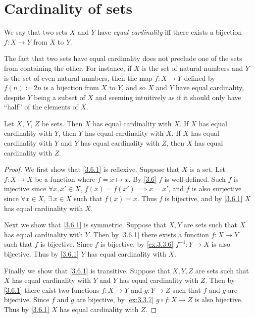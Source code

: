 \section{Cardinality of sets}\label{sec:3.6}

\begin{defn}\label{3.6.1}
  We say that two sets \(X\) and \(Y\) have \emph{equal cardinality} iff there exists a bijection \(f : X \to Y\) from \(X\) to \(Y\).
\end{defn}

\setcounter{thm}{2}
\begin{rmk}\label{3.6.3}
  The fact that two sets have equal cardinality does not preclude one of the sets from containing the other.
  For instance, if \(X\) is the set of natural numbers and \(Y\) is the set of even natural numbers, then the map \(f : X \to Y\) defined by \(f(n) \coloneqq 2n\) is a bijection from \(X\) to \(Y\), and so \(X\) and \(Y\) have equal cardinality, despite \(Y\) being a subset of \(X\) and seeming intuitively as if it should only have ``half'' of the elements of \(X\).
\end{rmk}

\begin{prop}\label{3.6.4}
  Let \(X\), \(Y\), \(Z\) be sets.
  Then \(X\) has equal cardinality with \(X\).
  If \(X\) has equal cardinality with \(Y\), then \(Y\) has equal cardinality with \(X\).
  If \(X\) has equal cardinality with \(Y\) and \(Y\) has equal cardinality with \(Z\), then \(X\) has equal cardinality with \(Z\).
\end{prop}

\begin{proof}
  We first show that \cref{3.6.1} is reflexive.
  Suppose that \(X\) is a set.
  Let \(f : X \to X\) be a function where \(f = x \mapsto x\).
  By \cref{3.6} \(f\) is well-defined.
  Such \(f\) is injective since \(\forall x, x' \in X\), \(f(x) = f(x') \implies x = x'\), and \(f\) is also surjective since \(\forall x \in X\), \(\exists\ x \in X\) such that \(f(x) = x\).
  Thus \(f\) is bijective, and by \cref{3.6.1} \(X\) has equal cardinality with \(X\).

  Next we show that \cref{3.6.1} is symmetric.
  Suppose that \(X, Y\) are sets such that \(X\) has equal cardinality with \(Y\).
  Then by \cref{3.6.1} there exists a function \(f : X \to Y\) such that \(f\) is bijective.
  Since \(f\) is bijective, by \cref{ex:3.3.6} \(f^{-1} : Y \to X\) is also bijective.
  Thus by \cref{3.6.1} \(Y\) has equal cardinality with \(X\).

  Finally we show that \cref{3.6.1} is transitive.
  Suppose that \(X, Y, Z\) are sets such that \(X\) has equal cardinality with \(Y\) and \(Y\) has equal cardinality with \(Z\).
  Then by \cref{3.6.1} there exist two functions \(f : X \to Y\) and \(g : Y \to Z\) such that \(f\) and \(g\) are bijective.
  Since \(f\) and \(g\) are bijective, by \cref{ex:3.3.7} \(g \circ f : X \to Z\) is also bijective.
  Thus by \cref{3.6.1} \(X\) has equal cardinality with \(Z\).
\end{proof}

